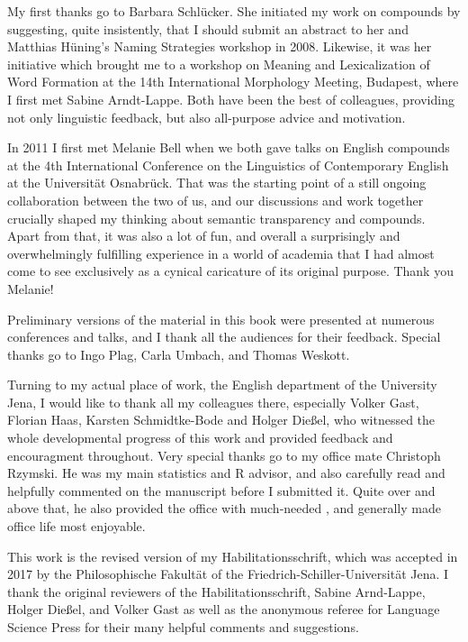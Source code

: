 \begin{refsection}

My first thanks go to Barbara Schlücker. She initiated my
work on compounds by suggesting, quite insistently, that I should submit an abstract to her and
Matthias Hüning's Naming Strategies workshop in 2008. Likewise, it was
her initiative which brought me to a workshop on Meaning and
Lexicalization of Word Formation at the 14th International Morphology
Meeting, Budapest, where I first met Sabine Arndt-Lappe. Both have
been the best of colleagues, providing not only linguistic feedback, but
also all-purpose advice and motivation. 

In 2011 I first met Melanie Bell when we both gave talks on English
compounds at the 4th International Conference on the Linguistics of
Contemporary English at the Universität Osnabrück. That was the
starting point of a still ongoing collaboration between the two of
us, and our discussions and work together crucially shaped my thinking about semantic transparency and
compounds. Apart from that, it was also a lot of fun, and overall a
surprisingly and overwhelmingly fulfilling experience in a world of
academia that I had almost come to see exclusively as a cynical caricature of its
original purpose. Thank you Melanie!

Preliminary versions of the material in this book were
presented at numerous conferences and talks, and I thank all the
audiences for their feedback. Special thanks go to Ingo Plag, Carla
Umbach, and Thomas Weskott.

Turning to my actual place of work, the English department of the
University Jena, I would like to thank all my colleagues there,
especially Volker Gast, Florian Haas, Karsten Schmidtke-Bode and Holger Dießel, who witnessed
the whole developmental progress of this work and provided feedback
and encouragment throughout. Very special thanks go to my office
mate Christoph Rzymski. He was my main statistics and \textsf{R}
advisor, and also carefully read and helpfully commented on the manuscript
before I submitted it. Quite over and above that, he also provided the
office with much-needed , and generally made office life most enjoyable.

\enlargethispage{1\baselineskip}
This work is the revised version of my Habilitationsschrift, which was
accepted in 2017 by the Philosophische Fakultät of the
Friedrich-Schiller-Universität Jena. I thank the original reviewers of
the Habilitationsschrift, Sabine Arnd-Lappe, Holger Dießel, and Volker
Gast as well as the anonymous referee for Language Science Press for
their many helpful comments and suggestions.


\end{refsection}
